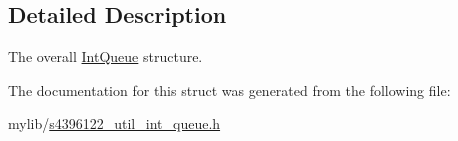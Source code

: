 \subsection{Detailed Description}
The overall \hyperlink{structIntQueue}{Int\+Queue} structure. 

The documentation for this struct was generated from the following file\+:\begin{DoxyCompactItemize}
\item 
mylib/\hyperlink{s4396122__util__int__queue_8h}{s4396122\+\_\+util\+\_\+int\+\_\+queue.\+h}\end{DoxyCompactItemize}

